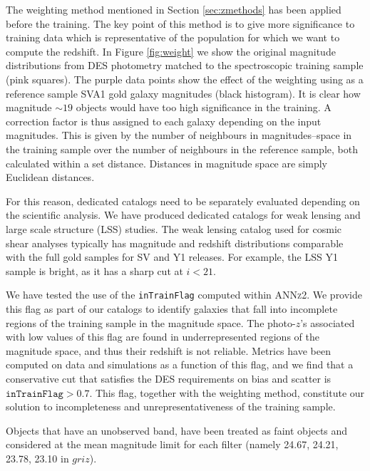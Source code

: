 The weighting method mentioned in Section \ref{sec:zmethods} has been applied before the training. The key point of this method is to give more significance to training data which is representative of the population for which we want to compute the redshift. In Figure \ref{fig:weight} we show the original magnitude distributions from DES photometry matched to the spectroscopic training sample (pink squares). The purple data points show the effect of the weighting using as a reference sample SVA1 gold galaxy magnitudes (black histogram). It is clear how magnitude $\sim 19$ objects would have too high significance in the training. A correction factor is thus assigned to each galaxy depending on the input magnitudes. This is given by the number of neighbours in magnitudes--space in the training sample over the number of neighbours in the reference sample, both calculated within a set distance. Distances in magnitude space are simply Euclidean distances.

For this reason, dedicated catalogs need to be separately evaluated depending on the scientific analysis. We have produced dedicated catalogs for weak lensing and large scale structure (LSS) studies. The weak lensing catalog used for cosmic shear analyses typically has magnitude and redshift distributions comparable with the full gold samples for SV and Y1 releases. For example, the LSS Y1 sample is bright, as it has a sharp cut at $i<21$.

We have tested the use of the \texttt{inTrainFlag} computed within \textsc{ANNz2}. We provide this flag as part of our catalogs to identify galaxies that fall into incomplete regions of the training sample in the magnitude space. The photo-$z$'s associated with low values of this flag are found in underrepresented regions of the magnitude space, and thus their redshift is not reliable. Metrics have been computed on data and simulations as a function of this flag, and we find that a conservative cut that satisfies the DES requirements on bias and scatter is $\texttt{inTrainFlag}>0.7$. This flag, together with the weighting method, constitute our solution to incompleteness and unrepresentativeness of the training sample. 

Objects that have an unobserved band, have been treated as faint objects and considered at the mean magnitude limit for each filter (namely 24.67, 24.21, 23.78, 23.10 in $griz$). 

